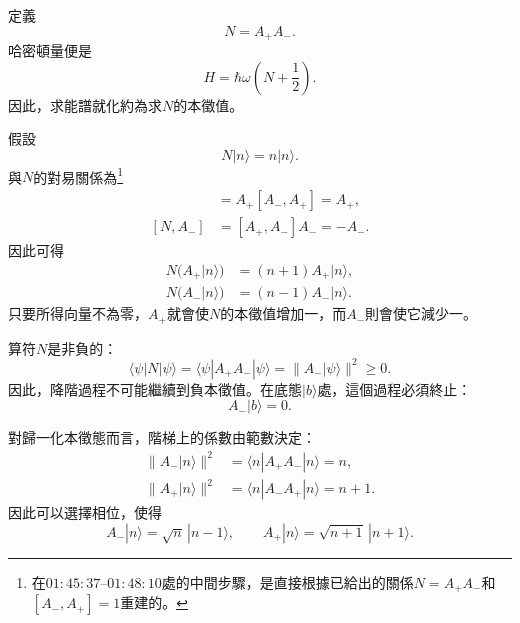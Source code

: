 定義
\begin{equation}
N=A_+A_-.
\end{equation}
哈密頓量便是
\begin{equation}
H=\hbar\omega\left(N+\frac{1}{2}\right).
\end{equation}
因此，求能譜就化約為求\(N\)的本徵值。

假設
\begin{equation}
N|n\rangle=n|n\rangle.
\end{equation}
與\(N\)的對易關係為\footnote{在\(01{:}45{:}37\)--\(01{:}48{:}10\)處的中間步驟，是直接根據已給出的關係\(N=A_+A_-\)和\([A_-,A_+]=1\)重建的。}
\begin{align}
[N,A_+]
&=A_+[A_-,A_+]=A_+, \\
[N,A_-]
&=[A_+,A_-]A_-=-A_-.
\end{align}
因此可得
\begin{align}
N\bigl(A_+|n\rangle\bigr)
&=(n+1)A_+|n\rangle, \\
N\bigl(A_-|n\rangle\bigr)
&=(n-1)A_-|n\rangle.
\end{align}
只要所得向量不為零，\(A_+\)就會使\(N\)的本徵值增加一，而\(A_-\)則會使它減少一。

算符\(N\)是非負的：
\begin{equation}
\langle\psi|N|\psi\rangle
=\langle\psi|A_+A_-|\psi\rangle
=\|A_-|\psi\rangle\|^2
\geq0.
\end{equation}
因此，降階過程不可能繼續到負本徵值。在底態\(|b\rangle\)處，這個過程必須終止：
\begin{equation}
A_-|b\rangle=0.
\end{equation}

對歸一化本徵態而言，階梯上的係數由範數決定：
\begin{align}
\|A_-|n\rangle\|^2
&=\langle n|A_+A_-|n\rangle=n, \\
\|A_+|n\rangle\|^2
&=\langle n|A_-A_+|n\rangle=n+1.
\end{align}
因此可以選擇相位，使得
\begin{equation}
A_-|n\rangle=\sqrt{n}\,|n-1\rangle,
\qquad
A_+|n\rangle=\sqrt{n+1}\,|n+1\rangle.
\end{equation}

\begin{classroomqa}
\end{classroomqa}


